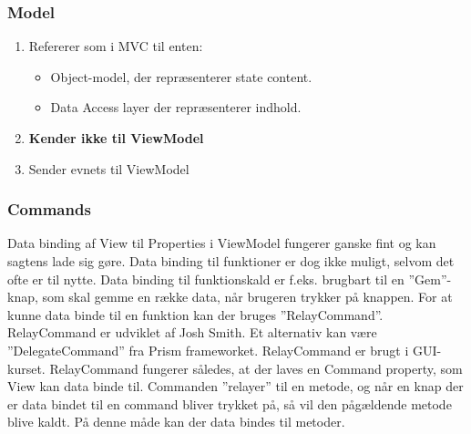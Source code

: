 \subsubsection{Model}
\begin{enumerate}
	\item Refererer som i MVC til enten:
	\begin{itemize}
		\item Object-model, der repræsenterer state content.
		\item Data Access layer der repræsenterer indhold.
	\end{itemize}
	\item \textbf{Kender ikke til ViewModel}
	\item Sender evnets til ViewModel
\end{enumerate}

\subsubsection{Commands}
Data binding af View til Properties i ViewModel fungerer ganske fint og kan sagtens lade sig gøre. Data binding til funktioner er dog ikke muligt, selvom det ofte er til nytte. Data binding til funktionskald er f.eks. brugbart til en ”Gem”-knap, som skal gemme en række data, når brugeren trykker på knappen.
For at kunne data binde til en funktion kan der bruges ”RelayCommand”. RelayCommand er udviklet af Josh Smith. Et alternativ kan være ”DelegateCommand” fra Prism frameworket. RelayCommand er brugt i GUI-kurset.
RelayCommand fungerer således, at der laves en Command property, som View kan data binde til. Commanden ”relayer” til en metode, og når en knap der er data bindet til en command bliver trykket på, så vil den pågældende metode blive kaldt. På denne måde kan der data bindes til metoder.

